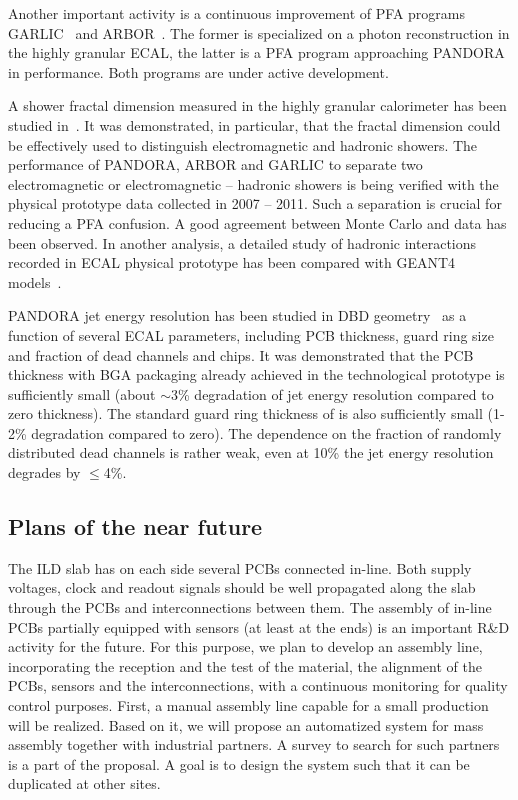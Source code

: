 Another important activity is a continuous improvement of PFA programs
GARLIC~\cite{2012JInst...7.6003J} and ARBOR~\cite{Ruan:2014paa}. The former is specialized on a
photon reconstruction in the highly granular ECAL, the latter is a PFA program
approaching PANDORA~\cite{Thomson200925} in performance. Both programs are under
active development.

A shower fractal dimension measured in the highly granular calorimeter has
been studied in~\cite{Ruan:2013iaa}. It was demonstrated, in particular, that the
fractal dimension could be effectively used to distinguish electromagnetic and
hadronic showers. The performance of PANDORA, ARBOR and GARLIC to separate two
electromagnetic or electromagnetic -- hadronic showers is being verified with
the physical prototype data collected in 2007 -- 2011. Such a separation is
crucial for reducing a PFA confusion. A good agreement between Monte Carlo and
data has been observed. In another analysis, a detailed study of hadronic
interactions recorded in ECAL physical prototype has been compared with GEANT4
models~\cite{Bilki2015240}.

PANDORA jet energy resolution has been studied in DBD geometry~\cite{Kozakai:2014yka} as
a function of several ECAL parameters, including PCB thickness, guard ring
size and fraction of dead channels and chips. It was demonstrated that the PCB
thickness with BGA packaging already achieved in the technological prototype
is sufficiently small (about $\sim$3\% degradation of jet energy resolution
compared to zero thickness). The standard guard ring thickness of \unit[500]{\micron}
is also sufficiently small (1-2\% degradation compared to zero). The
dependence on the fraction of randomly distributed dead channels is rather
weak, even at 10\% the jet energy resolution degrades by $\le$4\%.

\subsection{Plans of the near future}
The ILD slab has on each side several PCBs connected in-line. Both supply
voltages, clock and readout signals should be well propagated along the slab
through the PCBs and interconnections between them. The assembly of in-line
PCBs partially equipped with sensors (at least at the ends) is an important
R\&D activity for the future. For this purpose, we plan to develop an
assembly line, incorporating the reception and the test of the material, the
alignment of the PCBs, sensors and the interconnections, with a continuous
monitoring for quality control purposes. First, a manual assembly line capable
for a small production will be realized. Based on it, we will propose an
automatized system for mass assembly together with industrial partners. A
survey to search for such partners is a part of the proposal. A goal is to
design the system such that it can be duplicated at other sites.

